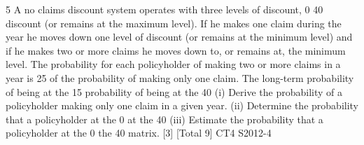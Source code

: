 \documentclass[a4paper,12pt]{article}
\begin{document}
5 A no claims discount system operates with three levels of discount, 0%
40%
discount (or remains at the maximum level). If he makes one claim during the year he
moves down one level of discount (or remains at the minimum level) and if he makes
two or more claims he moves down to, or remains at, the minimum level.
The probability for each policyholder of making two or more claims in a year is 25%
of the probability of making only one claim.
The long-term probability of being at the 15%
probability of being at the 40%
(i) Derive the probability of a policyholder making only one claim in a given
year. 
(ii) Determine the probability that a policyholder at the 0%
at the 40%
(iii) Estimate the probability that a policyholder at the 0%
the 40%
matrix. [3]
[Total 9]
CT4 S2012-4
\end{document}
